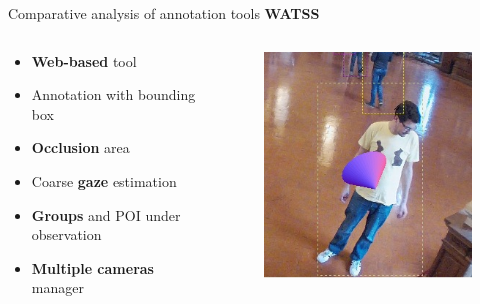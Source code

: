 \documentclass{beamer}
\begin{document}
\begin{tframe}{Comparative analysis of annotation tools}
\textbf{WATSS} 
\begin{columns}[t] %
\begin{column}{.45\textwidth}
\begin{itemize}
\item \textbf{Web-based} tool
\vspace{0.1cm}
\item Annotation with bounding box
\vspace{0.1cm}
\item \textbf{Occlusion} area
\vspace{0.1cm}
\item Coarse \textbf{gaze} estimation
\vspace{0.1cm}
\item \textbf{Groups} and POI under observation
\vspace{0.1cm}
\item \textbf{Multiple cameras} manager
\end{itemize}
\end{column}%
\begin{column}{.3\textwidth}
\begin{figure}[h]
\centering
\includegraphics[width=1\textwidth]{images/gaze.jpg}
\end{figure}
\end{column}%
\end{columns}
\end{tframe}
\end{document}
